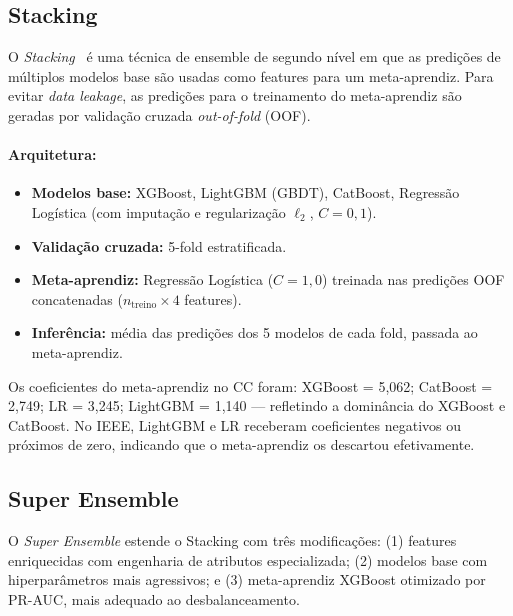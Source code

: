 \documentclass[12pt,a4paper]{article}
\newcommand{\algo}[1]{\textit{#1}}
\begin{document}
\subsection{Stacking}
\label{sec:stacking}

O \algo{Stacking}~\cite{wolpert1992stacked} é uma técnica de ensemble de
segundo nível em que as predições de múltiplos modelos base são usadas como
features para um meta-aprendiz. Para evitar \textit{data leakage}, as predições
para o treinamento do meta-aprendiz são geradas por validação cruzada
\textit{out-of-fold} (OOF).

\paragraph{Arquitetura:}
\begin{itemize}[nosep]
  \item \textbf{Modelos base:} XGBoost, LightGBM (GBDT), CatBoost, Regressão
    Logística (com imputação e regularização $\ell_2$, $C=0{,}1$).
  \item \textbf{Validação cruzada:} 5-fold estratificada.
  \item \textbf{Meta-aprendiz:} Regressão Logística ($C=1{,}0$) treinada nas
    predições OOF concatenadas ($n_\text{treino} \times 4$ features).
  \item \textbf{Inferência:} média das predições dos 5 modelos de cada fold,
    passada ao meta-aprendiz.
\end{itemize}

Os coeficientes do meta-aprendiz no CC foram: XGBoost = 5{,}062;
CatBoost = 2{,}749; LR = 3{,}245; LightGBM = 1{,}140 — refletindo a dominância
do XGBoost e CatBoost. No IEEE, LightGBM e LR receberam coeficientes negativos
ou próximos de zero, indicando que o meta-aprendiz os descartou efetivamente.

\subsection{Super Ensemble}
\label{sec:superensemble}

O \algo{Super Ensemble} estende o Stacking com três modificações: (1) features
enriquecidas com engenharia de atributos especializada; (2) modelos base com
hiperparâmetros mais agressivos; e (3) meta-aprendiz XGBoost otimizado por
PR-AUC, mais adequado ao desbalanceamento.
\end{document}
